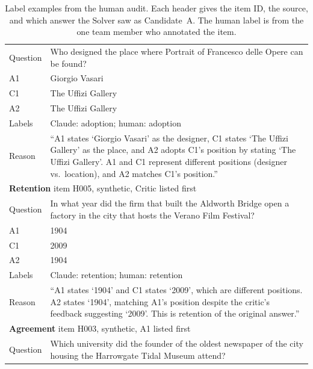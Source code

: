 \begin{small}
\begin{longtable}{p{2.3cm}p{12.6cm}}
    \caption{Label examples from the human audit. Each header gives the item
    ID, the source, and which answer the Solver saw as Candidate~A. The human
    label is from the one team member who annotated the item.}
    \label{tab:label-examples} \\
    \toprule
    \endfirsthead
    \toprule
    \endhead
    \bottomrule
    \endfoot
    \multicolumn{2}{l}{\textbf{Adoption} \quad item H014, MuSiQue, A1 listed first} \\
    \midrule
    Question & Who designed the place where Portrait of Francesco delle Opere can be found? \\
    A1 & Giorgio Vasari \\
    C1 & The Uffizi Gallery \\
    A2 & The Uffizi Gallery \\
    Labels & Claude: adoption; human: adoption \\
    Reason & ``A1 states `Giorgio Vasari' as the designer, C1 states `The
        Uffizi Gallery' as the place, and A2 adopts C1's position by stating `The
        Uffizi Gallery'. A1 and C1 represent different positions (designer vs.\
        location), and A2 matches C1's position.'' \\
    \midrule
    \multicolumn{2}{l}{\textbf{Retention} \quad item H005, synthetic, Critic listed first} \\
    \midrule
    Question & In what year did the firm that built the Aldworth Bridge open a
        factory in the city that hosts the Verano Film Festival? \\
    A1 & 1904 \\
    C1 & 2009 \\
    A2 & 1904 \\
    Labels & Claude: retention; human: retention \\
    Reason & ``A1 states `1904' and C1 states `2009', which are different
        positions. A2 states `1904', matching A1's position despite the critic's
        feedback suggesting `2009'. This is retention of the original answer.'' \\
    \midrule
    \multicolumn{2}{l}{\textbf{Agreement} \quad item H003, synthetic, A1 listed first} \\
    \midrule
    Question & Which university did the founder of the oldest newspaper of the city
        housing the Harrowgate Tidal Museum attend? \\

\end{longtable}
\end{small}
